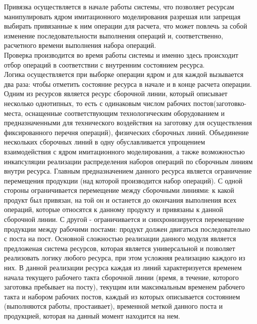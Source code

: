 \indent Привязка осуществляется в начале работы системы, что позволяет ресурсам манипулировать ядром имитационного моделирования разрешая или запрещая выбирать привязанные к ним операции для расчета, что может повлечь за собой изменение последовательности выполнения операций и, соответственно, расчетного времени выполнения набора операций.\\
\indent Проверка производится во время работы системы и именно здесь происходит отбор операций в соответствии с внутренним состоянием ресурса.\\
\indent Логика осуществляется при выборке операции ядром и для каждой вызывается два раза: чтобы отметить состояние ресурса в начале и в конце расчета операции.\\
\indent Одним из ресурсов является ресурс сборочной линии, который описывает несколько однотипных, то есть с одинаковым числом рабочих постов(заготовко-места, оснащенные соответствующим технологическим оборудованием и предназначенными для технического воздействия на заготовку для осуществления фиксированного перечня операций), физических сборочных линий.
Объединение нескольких сборочных линий в одну обуславливается упрощением взаимодействия с ядром имитационного моделирования, а также возможностью инкапсуляции реализации распределения наборов операций по сборочным линиям внутри ресурса.
\indent Главным предназначением данного ресурса является ограничение перемещения продукции (над которой производится набор операций).
С одной стороны ограничивается перемещение между сборочными линиями: к какой продукт был привязан, на той он и останется до окончания выполнения всех операций, которые относятся к данному продукту и привязаны к данной сборочной линии.
С другой - ограничивается и синхронизируется перемещение продукции между рабочими постами: продукт должен двигаться последовательно с поста на пост.
\indent Основной сложностью реализации данного модуля является предложеная система ресурсов, которая является универсальной и позволяет реализовать логику любого ресурса, при этом усложняя реализацию каждого из них.
В данной реализации ресурса каждая из линий характеризуется временем начала текущего рабочего такта сборочной линии (время, в течение, которого заготовка пребывает на посту), текущим или максимальным временем рабочего такта и набором рабочих постов, каждый из которых описывается состоянием (выполняются работы, простаивает), временной меткой данного поста и продукцией, которая на данный момент находится на нем.


